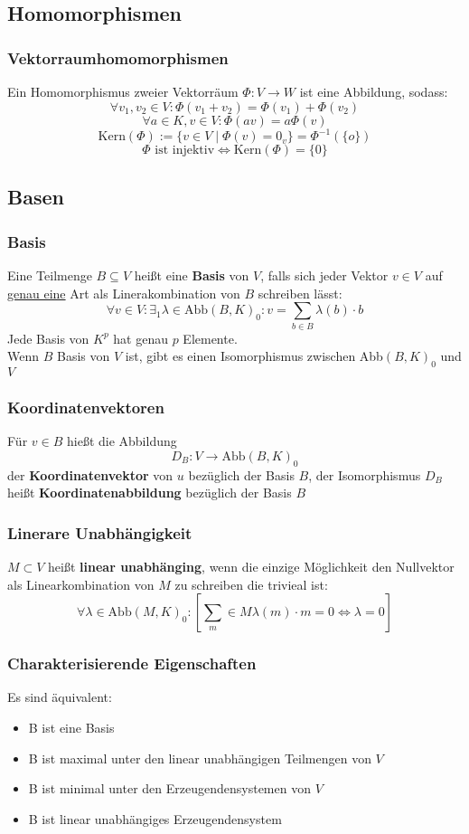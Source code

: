 \documentclass{kit}
\begin{document}
  \subsection{Homomorphismen}
    \subsubsection{Vektorraumhomomorphismen}
      Ein Homomorphismus zweier Vektorräum $\Phi:V\longrightarrow W$ ist eine Abbildung, sodass:
      $$\forall v_1,v_2\in V:\Phi(v_1+v_2)=\Phi(v_1)+\Phi(v_2)$$
      $$\forall a\in K,v\in V:\Phi(av)=a\Phi(v)$$
      $$\text{Kern}(\Phi):=\{v\in V\mid\Phi(v)=0_v\}=\Phi^{-1}(\{o\})$$
      $$\Phi\text{ ist injektiv}\Longleftrightarrow\text{Kern}(\Phi)=\{0\}$$
  \subsection{Basen}
    \subsubsection{Basis}
      Eine Teilmenge $B\subseteq V$ heißt eine \textbf{Basis} von $V$, falls sich jeder Vektor $v\in V$ auf \underline{genau eine} Art als Linerakombination von $B$ schreiben lässt:
      $$\forall v\in V:\exists_1\lambda\in\text{Abb}(B,K)_0:v=\sum_{b\in B}\lambda(b)\cdot b$$
      Jede Basis von $K^p$ hat genau $p$ Elemente.\\
      Wenn $B$ Basis von $V$ ist, gibt es einen Isomorphismus zwischen Abb$(B,K)_0$ und $V$
    \subsubsection{Koordinatenvektoren}
      Für $v\in B$ hießt die Abbildung
      $$D_B:V\longrightarrow\text{Abb}(B,K)_0$$
      der \textbf{Koordinatenvektor} von $u$ bezüglich der Basis $B$, der Isomorphismus $D_B$ heißt \textbf{Koordinatenabbildung} bezüglich der Basis $B$
    \subsubsection{Linerare Unabhängigkeit}
      $M\subset V$ heißt \textbf{linear unabhänging}, wenn die einzige Möglichkeit den Nullvektor als Linearkombination von $M$ zu schreiben die trivieal ist:
      $$\forall\lambda\in\text{Abb}(M,K)_0:[\sum_m\in M\lambda(m)\cdot m=0\Leftrightarrow \lambda=0]$$
    \subsubsection{Charakterisierende Eigenschaften}
      Es sind äquivalent:
      \begin{itemize}
        \item B ist eine Basis 
        \item B ist maximal unter den linear unabhängigen Teilmengen von $V$
        \item B ist minimal unter den Erzeugendensystemen von $V$
        \item B ist linear unabhängiges Erzeugendensystem
      \end{itemize}
\end{document}
